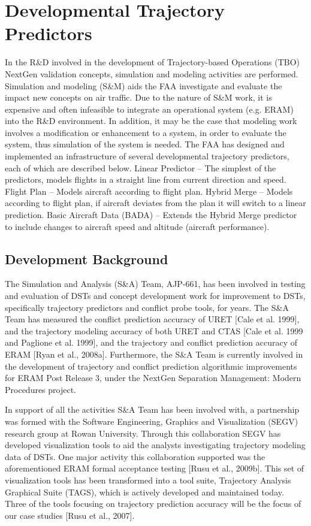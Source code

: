 \documentclass[]{article}
\begin{document}
\section{Developmental Trajectory Predictors}
\label{devTP}

 In the R\&D involved in the development of Trajectory-based Operations (TBO) NextGen validation concepts, simulation and modeling activities are performed. Simulation and modeling (S\&M) aids the FAA investigate and evaluate the impact new concepts on air traffic. Due to the nature of S\&M work, it is expensive and often infeasible to integrate an operational system (e.g. ERAM) into the R\&D environment. In addition, it may be the case that modeling work involves a modification or enhancement to a system, in order to evaluate the system, thus simulation of the system is needed. The FAA has designed and implemented an infrastructure of several developmental trajectory predictors, each of which are described below.
Linear Predictor – The simplest of the predictors, models flights in a straight line from current direction and speed.
Flight Plan – Models aircraft according to flight plan.
Hybrid Merge – Models according to flight plan, if aircraft deviates from the plan it will switch to a linear prediction.
Basic Aircraft Data (BADA) – Extends the Hybrid Merge predictor to include changes to aircraft speed and altitude (aircraft performance).

\subsection{Development Background}
\label{devBackground}

The Simulation and Analysis (S\&A) Team, AJP-661, has been involved in testing and evaluation of DSTs and concept development work for improvement to DSTs, specifically trajectory predictors and conflict probe tools, for years. The S\&A Team has measured the conflict prediction accuracy of URET [Cale et al. 1999], and the trajectory modeling accuracy of both URET and CTAS [Cale et al. 1999 and Paglione et al. 1999], and the trajectory and conflict prediction accuracy of ERAM [Ryan et al., 2008a]. Furthermore, the S\&A Team is currently involved in the development of trajectory and conflict prediction algorithmic improvements for ERAM Post Release 3, under the NextGen Separation Management: Modern Procedures project.

In support of all the activities S\&A Team has been involved with, a partnership was formed with the Software Engineering, Graphics and Visualization (SEGV) research group at Rowan University. Through this collaboration SEGV has developed visualization tools to aid the analysts investigating trajectory modeling data of DSTs. One major activity this collaboration supported was the aforementioned ERAM formal acceptance testing [Rusu et al., 2009b]. This set of visualization tools has been transformed into a tool suite, Trajectory Analysis Graphical Suite (TAGS), which is actively developed and maintained today. Three of the tools focusing on trajectory prediction accuracy will be the focus of our case studies [Rusu et al., 2007].
\end{document}
